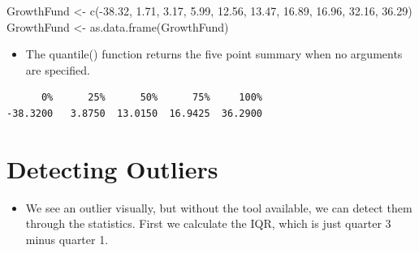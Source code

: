 \documentclass[
  letterpaper,
  DIV=11,
  numbers=noendperiod]{scrreprt}
\newenvironment{Shaded}{\begin{snugshade}}{\end{snugshade}}
\newcommand{\FloatTok}[1]{\textcolor[rgb]{0.68,0.00,0.00}{#1}}
\newcommand{\FunctionTok}[1]{\textcolor[rgb]{0.28,0.35,0.67}{#1}}
\newcommand{\NormalTok}[1]{\textcolor[rgb]{0.00,0.23,0.31}{#1}}
\newcommand{\OtherTok}[1]{\textcolor[rgb]{0.00,0.23,0.31}{#1}}
\newcommand{\SpecialCharTok}[1]{\textcolor[rgb]{0.37,0.37,0.37}{#1}}
\providecommand{\tightlist}{%
  \setlength{\itemsep}{0pt}\setlength{\parskip}{0pt}}\usepackage{longtable,booktabs,array}
\begin{document}
\begin{Shaded}
\begin{Highlighting}[]
\NormalTok{GrowthFund }\OtherTok{\textless{}{-}} \FunctionTok{c}\NormalTok{(}\SpecialCharTok{{-}}\FloatTok{38.32}\NormalTok{, }\FloatTok{1.71}\NormalTok{, }\FloatTok{3.17}\NormalTok{, }\FloatTok{5.99}\NormalTok{, }\FloatTok{12.56}\NormalTok{, }\FloatTok{13.47}\NormalTok{, }\FloatTok{16.89}\NormalTok{, }\FloatTok{16.96}\NormalTok{, }\FloatTok{32.16}\NormalTok{,}
    \FloatTok{36.29}\NormalTok{)}
\NormalTok{GrowthFund }\OtherTok{\textless{}{-}} \FunctionTok{as.data.frame}\NormalTok{(GrowthFund)}
\end{Highlighting}
\end{Shaded}

\begin{itemize}
\tightlist
\item
  The quantile() function returns the five point summary when no
  arguments are specified.
\end{itemize}

\begin{Shaded}
\end{Shaded}

\begin{verbatim}
      0%      25%      50%      75%     100% 
-38.3200   3.8750  13.0150  16.9425  36.2900 
\end{verbatim}

\section{Detecting Outliers}\label{detecting-outliers}

\begin{itemize}
\tightlist
\item
  We see an outlier visually, but without the tool available, we can
  detect them through the statistics. First we calculate the IQR, which
  is just quarter 3 minus quarter 1.
\end{itemize}

\begin{Shaded}
\end{Shaded}
\end{document}
